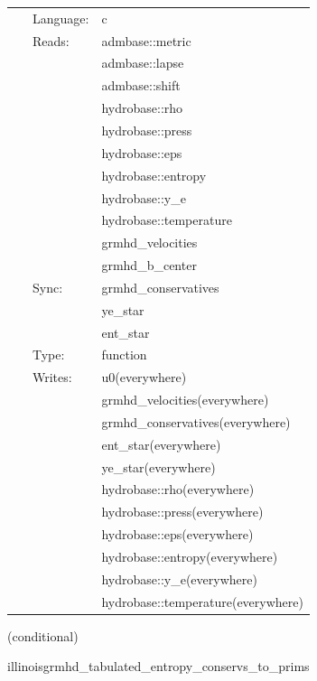 \documentclass{article}
\begin{document}
 \begin{tabular*}{160mm}{cll} 
~ & Language:  & c \\ 
~ & Reads:  & admbase::metric \\ 
~& ~ &admbase::lapse\\ 
~& ~ &admbase::shift\\ 
~& ~ &hydrobase::rho\\ 
~& ~ &hydrobase::press\\ 
~& ~ &hydrobase::eps\\ 
~& ~ &hydrobase::entropy\\ 
~& ~ &hydrobase::y\_e\\ 
~& ~ &hydrobase::temperature\\ 
~& ~ &grmhd\_velocities\\ 
~& ~ &grmhd\_b\_center\\ 
~ & Sync:  & grmhd\_conservatives \\ 
~& ~ &ye\_star\\ 
~& ~ &ent\_star\\ 
~ & Type:  & function \\ 
~ & Writes:  & u0(everywhere) \\ 
~& ~ &grmhd\_velocities(everywhere)\\ 
~& ~ &grmhd\_conservatives(everywhere)\\ 
~& ~ &ent\_star(everywhere)\\ 
~& ~ &ye\_star(everywhere)\\ 
~& ~ &hydrobase::rho(everywhere)\\ 
~& ~ &hydrobase::press(everywhere)\\ 
~& ~ &hydrobase::eps(everywhere)\\ 
~& ~ &hydrobase::entropy(everywhere)\\ 
~& ~ &hydrobase::y\_e(everywhere)\\ 
~& ~ &hydrobase::temperature(everywhere)\\ 
\end{tabular*} 


\vspace{5mm}

   (conditional) 

\hspace{5mm} illinoisgrmhd\_tabulated\_entropy\_conservs\_to\_prims 

\hspace{5mm}{\it entropy+tabulated version of illinoisgrmhd\_conservs\_to\_prims } 


\hspace{5mm}
\end{document}
